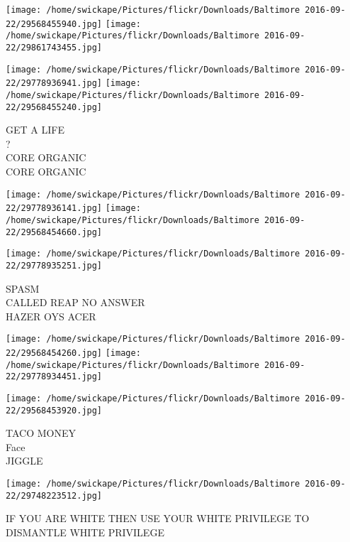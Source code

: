 \documentclass[10pt,letterpaper]{article}
\begin{document}
\texttt{[image: /home/swickape/Pictures/flickr/Downloads/Baltimore 2016-09-22/29568455940.jpg]}
\texttt{[image: /home/swickape/Pictures/flickr/Downloads/Baltimore 2016-09-22/29861743455.jpg]}

\texttt{[image: /home/swickape/Pictures/flickr/Downloads/Baltimore 2016-09-22/29778936941.jpg]}
\texttt{[image: /home/swickape/Pictures/flickr/Downloads/Baltimore 2016-09-22/29568455240.jpg]}

GET A LIFE\\
?\\
CORE ORGANIC\\
CORE ORGANIC
\pagebreak

\texttt{[image: /home/swickape/Pictures/flickr/Downloads/Baltimore 2016-09-22/29778936141.jpg]}
\texttt{[image: /home/swickape/Pictures/flickr/Downloads/Baltimore 2016-09-22/29568454660.jpg]}

\vspace{0.25in}
\texttt{[image: /home/swickape/Pictures/flickr/Downloads/Baltimore 2016-09-22/29778935251.jpg]}

SPASM\\
CALLED REAP NO ANSWER\\
HAZER OYS ACER
\pagebreak

\texttt{[image: /home/swickape/Pictures/flickr/Downloads/Baltimore 2016-09-22/29568454260.jpg]}
\texttt{[image: /home/swickape/Pictures/flickr/Downloads/Baltimore 2016-09-22/29778934451.jpg]}

\vspace{0.25in}
\texttt{[image: /home/swickape/Pictures/flickr/Downloads/Baltimore 2016-09-22/29568453920.jpg]}

TACO MONEY\\
Face\\
JIGGLE
\pagebreak

\texttt{[image: /home/swickape/Pictures/flickr/Downloads/Baltimore 2016-09-22/29748223512.jpg]}

IF YOU ARE WHITE THEN USE YOUR WHITE PRIVILEGE TO DISMANTLE WHITE PRIVILEGE
\pagebreak
\end{document}
